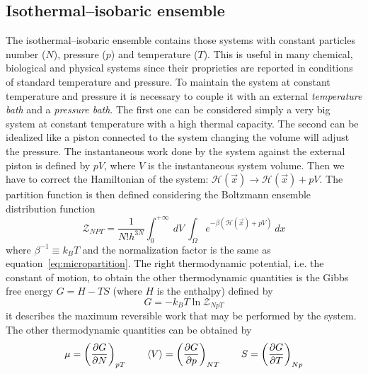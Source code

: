 \subsection{Isothermal--isobaric ensemble}
The isothermal--isobaric ensemble contains those systems with constant particles number ($N$), pressure ($p$) and temperature ($T$). This is useful in many chemical, biological and physical systems since their proprieties are reported in conditions of standard temperature and pressure. To maintain the system at constant temperature and pressure it is necessary to couple it with an external \textit{temperature bath} and a \textit{pressure bath}.
The first one can be considered simply a very big system at constant temperature with a high thermal capacity.
The second can be idealized like a piston connected to the system changing the volume will adjust the pressure.
The instantaneous work done by the system against the external piston is defined by $pV$, where $V$ is the instantaneous system volume. Then we have to correct the Hamiltonian of the system: $\mathcal{H}(\vec x) \rightarrow \mathcal{H}(\vec x) + pV$. The partition function is then defined considering the Boltzmann ensemble distribution function
\begin{equation*}
	\mathcal{Z}_{NPT} = \frac{1}{N!h^{3N}}\int_0^{+\infty}\ dV \ \int_\Omega e^{-\beta(\mathcal{H}(\vec x) + pV)}\ dx
\end{equation*}
where $\beta^{-1} \equiv k_B T$ and the normalization factor is the same as equation~\eqref{eq:micropartition}. The right thermodynamic potential, i.e. the constant of motion, to obtain the other thermodynamic quantities is the Gibbs free energy $G = H - TS$ (where $H$ is the enthalpy) defined by
\begin{equation*}
	G = -k_B T\ln \mathcal{Z}_{NpT}
\end{equation*}
it describes the maximum reversible work that may be performed by the system. The other thermodynamic quantities can be obtained by
\begin{equation*}
	\mu = \left ( \frac{\partial G}{\partial N}\right )_{pT} \qquad \left \langle V \right \rangle = \left ( \frac{\partial G}{\partial p}\right )_{NT} \qquad S = \left ( \frac{\partial G}{\partial T}\right )_{Np}
\end{equation*}

